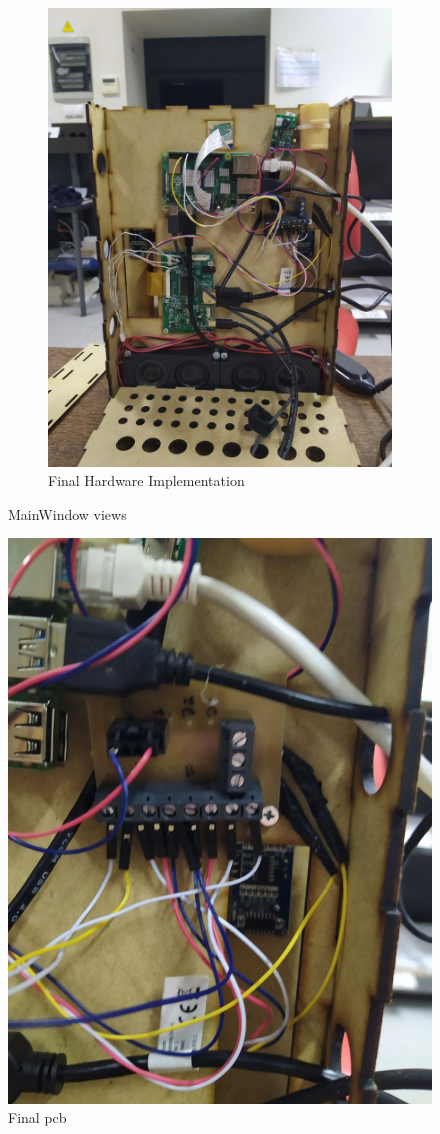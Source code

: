 \begin{figure}
\begin{subfigure}{.4\textwidth}
    \includegraphics[width=\textwidth]{img/hw-inside.jpg}%
  \caption{Final Hardware Implementation}%
  \label{fig:hw-inside}
  \end{subfigure}
  \caption{MainWindow views}%
  \label{fig:hw-imp}
\end{figure}
%
\begin{figure}[!htb]
    \includegraphics[width=.5\textwidth]{img/pcb.jpg}%
  \caption{Final \gls{pcb}}%
  \label{fig:pcb}
  \end{figure}

